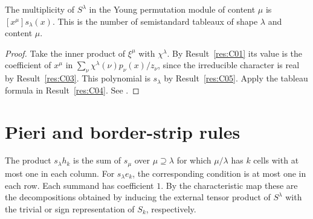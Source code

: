\begin{corollary}\label{res:C06}
The multiplicity of \(S^\lambda\) in the Young permutation module of
content \(\mu\) is \([x^\mu]s_\lambda(x)\). This is the number of
semistandard tableaux of shape \(\lambda\) and content \(\mu\).
\end{corollary}

\begin{proof}
Take the inner product of \(\xi^\mu\) with \(\chi^\lambda\).
By Result~\ref{res:C01} its value is the coefficient of \(x^\mu\) in
\(\sum_\nu\chi^\lambda(\nu)p_\nu(x)/z_\nu\), since the irreducible
character is real by Result~\ref{res:C03}. This polynomial is
\(s_\lambda\) by Result~\ref{res:C05}. Apply the tableau formula in
Result~\ref{res:C04}. See \cite[Theorem 2.11.2]{sagan}.
\end{proof}

\section{Pieri and border-strip rules}

\begin{theorem}\label{res:C07}
The product \(s_\lambda h_k\) is the sum of \(s_\mu\) over
\(\mu\supseteq\lambda\) for which \(\mu/\lambda\) has \(k\) cells
with at most one in each column. For \(s_\lambda e_k\), the
corresponding condition is at most one in each row. Each summand
has coefficient \(1\). By the characteristic map these are the
decompositions obtained by inducing the external tensor product of
\(S^\lambda\) with the trivial or sign representation of \(S_k\),
respectively.
\end{theorem}

